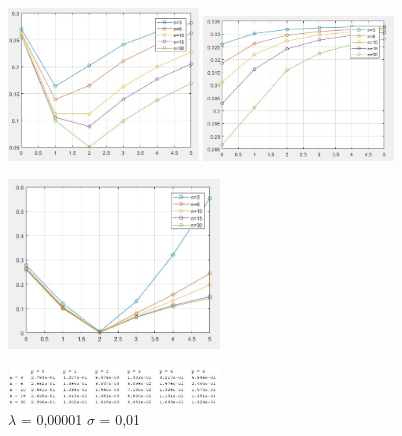 \begin{figure}[!tbp]
	\centering
	\includegraphics[width=0.45\textwidth]{pl1s001.png}
	\hfill
	\includegraphics[width=0.45\textwidth]{pl100s01.png}
\end{figure}
\begin{figure}[!tbp]
	\centering
	\hfill
	
\end{figure}






\begin{figure}[h]
	\centering
	\includegraphics[width=0.5\textwidth]{pl000001s001.png}
\end{figure}

\begin{figure}[h]
	\centering
	\includegraphics[width=0.5\textwidth]{tl000001s001.png}
	\caption{$\lambda$ = 0,00001 $\sigma$ = 0,01}
	\label{fig:lambda = 0,00001 sigma = 0,01}
\end{figure}